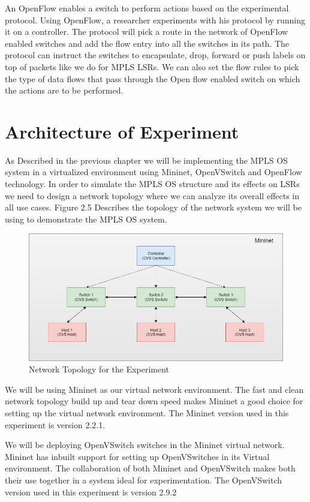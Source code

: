 An OpenFlow enables a switch to perform actions based on the experimental protocol. Using OpenFlow, a researcher experiments with his protocol by running it on a controller. The protocol will pick a route in the network of OpenFlow enabled switches and add the flow entry into all the switches in its path. The protocol can instruct the switches to encapsulate, drop, forward or push labels on top of packets like we do for MPLS LSRs. We can also set the flow rules to pick the type of data flows that pass through the Open flow enabled switch on which the actions are to be performed.

\section{Architecture of Experiment}
As Described in the previous chapter we will be implementing the MPLS OS system in a virtualized environment using Mininet, OpenVSwitch and OpenFlow technology. In order to simulate the MPLS OS structure and its effects on LSRs we need to design a network topology where we can analyze its overall effects in all use cases. Figure 2.5 Describes the topology of the network system we will be using to demonstrate the MPLS OS system.

\begin{figure}[H]
       \centering\includegraphics[width=\textwidth]{images/9_Topology.jpg}
       \caption{Network Topology for the Experiment}
       \label{fig:compbest}
\end{figure}

We will be using Mininet as our virtual network environment. The fast and clean network topology build up and tear down speed makes Mininet a good choice for setting up the virtual network environment. The Mininet version used in this experiment is version 2.2.1.

We will be deploying OpenVSwitch switches in the Mininet virtual network. Mininet has inbuilt support for setting up OpenVSwitches in its Virtual environment. The collaboration of both Mininet and OpenVSwitch makes both their use together in a system ideal for experimentation. The OpenVSwitch version used in this experiment is version 2.9.2

